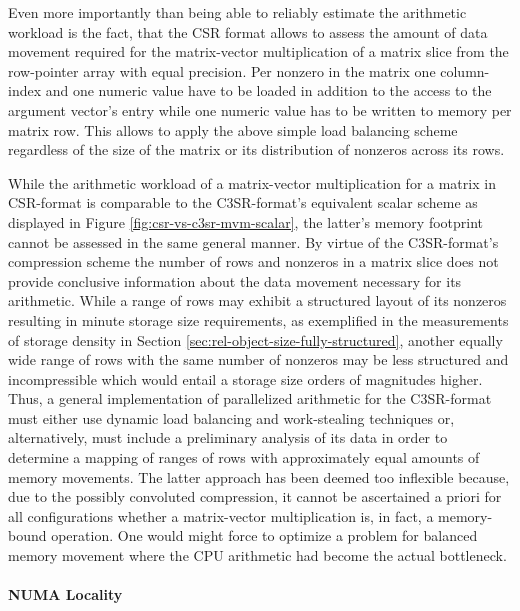     Even more importantly than being able to reliably estimate the arithmetic workload is the fact, that the CSR format
    allows to assess the amount of data movement required for the matrix-vector multiplication of a matrix slice from
    the row-pointer array with equal precision. Per nonzero in the matrix one column-index and one numeric value have to
    be loaded in addition to the access to the argument vector's entry while one numeric value has to be written to memory
    per matrix row. This allows to apply the above simple load balancing scheme regardless of the size of the matrix or
    its distribution of nonzeros across its rows.

    While the arithmetic workload of a matrix-vector multiplication for a matrix in CSR-format is comparable to the
    C3SR-format's equivalent scalar scheme as displayed in Figure \ref{fig:csr-vs-c3sr-mvm-scalar}, the latter's memory
    footprint cannot be assessed in the same general manner. By virtue of the C3SR-format's compression scheme the
    number of rows and nonzeros in a matrix slice does not provide conclusive information about the data movement
    necessary for its arithmetic. While a range of rows may exhibit a structured layout of its nonzeros resulting in
    minute storage size requirements, as exemplified in the measurements of storage density in Section
    \ref{sec:rel-object-size-fully-structured}, another equally wide range of rows with the same number of nonzeros may
    be less structured and incompressible which would entail a storage size orders of magnitudes higher. Thus, a general
    implementation of parallelized arithmetic for the C3SR-format must either use dynamic load balancing and
    work-stealing techniques or, alternatively, must include a preliminary analysis of its data in order to determine a
    mapping of ranges of rows with approximately equal amounts of memory movements. The latter approach has been deemed
    too inflexible because, due to the possibly convoluted compression, it cannot be ascertained a priori for all
    configurations whether a matrix-vector multiplication is, in fact, a memory-bound operation. One would might force
    to optimize a problem for balanced memory movement where the CPU arithmetic had become the actual bottleneck.

    \paragraph{NUMA Locality}

